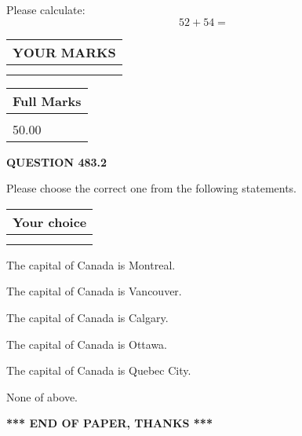 \documentclass[12pt]{article}
\begin{document}
  
 
Please calculate:
\begin{equation}
52 +  %
54 = \nonumber
\end{equation}
 

 

 
  
\vspace{0.2in}
  
\noindent\begin{tabular}{|l|}
\hline
 YOUR MARKS  \\
\hline
 \\ 
 \\ 
\hline
\end{tabular}
\hspace{0.05in} \begin{tabular}{|l|}
\hline
 Full Marks  \\
\hline
 \\ 
50.00 \\
\hline
\end{tabular}
{\textbf{\Large{QUESTION
483.2 
}}}
  
  
Please choose the correct one from the following statements.
  
  
\noindent\hspace{3.0in} \begin{tabular}{|l|}
\hline
Your choice \\
\hline
 \\ 
 \\ 
\hline
\end{tabular}
  
  
 
 
The capital of Canada is Montreal.
 
 
The capital of Canada is Vancouver.
 
 
The capital of Canada is Calgary.
 
 
The capital of Canada is Ottawa.
 
 
The capital of Canada is Quebec City.
 
 
 None of above.
 
 
   
   
 \vspace{0.2in}
 
   
   
   
   
\vspace{1.0in} 
{\textbf{\large{ *** END OF PAPER, THANKS *** }}} 
   
\end{document}
